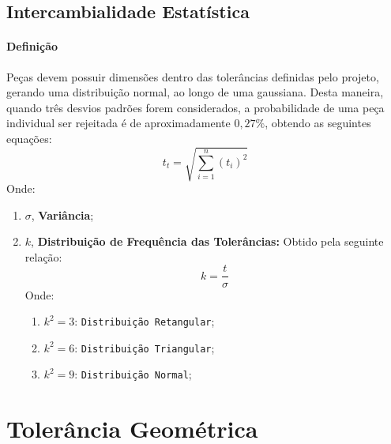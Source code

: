 \documentclass{article}
\begin{document}
        \subsection{Intercambialidade Estatística}
            \paragraph{Definição}Peças devem possuir dimensões dentro das tolerâncias definidas pelo projeto, gerando uma distribuição normal, ao longo de uma gaussiana. Desta maneira, quando três desvios padrões forem considerados, a probabilidade de uma peça individual ser rejeitada é de aproximadamente $0,27\%$, obtendo as seguintes equações:
                \begin{equation}
                    \boxed{
                        t_{t} = \sqrt{\sum_{i=1}^{n} (t_{i})^{2}}
                    }
                \end{equation}
            Onde:
                \begin{enumerate}[noitemsep]
                    \item $\sigma$, \textbf{Variância};
                    \item $k$, \textbf{Distribuição de Frequência das Tolerâncias:} Obtido pela seguinte relação:
                        \[
                            \boxed{
                                k = \frac{t}{\sigma}
                            }
                        \]
                    Onde:
                        \begin{enumerate}[noitemsep]
                            \item $k^{2} = 3$: \texttt{Distribuição Retangular};
                            \item $k^{2} = 6$: \texttt{Distribuição Triangular};
                            \item $k^{2} = 9$: \texttt{Distribuição Normal};
                        \end{enumerate}
                \end{enumerate}
\newpage

    \section{Tolerância Geométrica}
\end{document}
